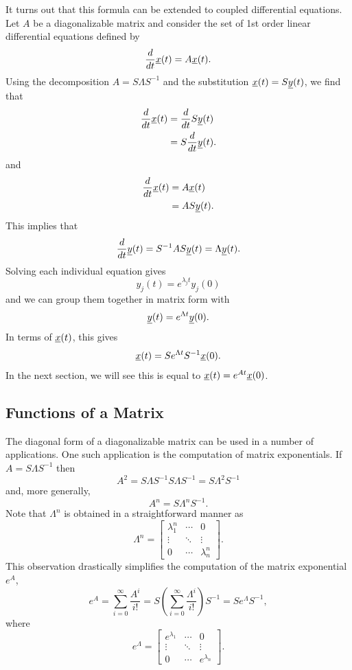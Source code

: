 It turns out that this formula can be extended to coupled differential equations.
Let $A$ be a diagonalizable matrix and consider the set of 1st order linear differential equations defined by
\[ \frac{d}{dt} \underline{x}(t) = A \underline{x}(t). \]
Using the decomposition $A = S \Lambda S^{-1}$ and the substitution $\underline{x}(t) = S \underline{y}(t)$, we find that
\begin{align*}
\frac{d}{dt} \underline{x}(t)
& = \frac{d}{dt} S \underline{y}(t) \\
& = S \frac{d}{dt} \underline{y}(t).
\end{align*}
and
\begin{align*}
\frac{d}{dt} \underline{x}(t)
& = A \underline{x}(t) \\
& = A S \underline{y}(t).
\end{align*}
This implies that
\[ \frac{d}{dt} \underline{y}(t) = S^{-1} A S \underline{y}(t) = \Lambda \underline{y}(t). \]
Solving each individual equation gives
\[ y_j (t) = e^{\lambda_j t} y_j (0) \]
and we can group them together in matrix form with
\[ \underline{y}(t) = e^{\Lambda t} \underline{y}(0). \]
In terms of $\underline{x}(t)$, this gives
\[ \underline{x}(t) = S e^{\Lambda t} S^{-1} \underline{x}(0). \]
In the next section, we will see this is equal to $ \underline{x}(t) = e^{A t} \underline{x}(0)$.

\subsection{Functions of a Matrix}

The diagonal form of a diagonalizable matrix can be used in a number of applications.
One such application is the computation of matrix exponentials.
If $A = S \Lambda S^{-1}$ then
\begin{equation*}
A^2 = S \Lambda S^{-1} S \Lambda S^{-1}
= S \Lambda^2 S^{-1}
\end{equation*}
and, more generally,
\begin{equation*}
A^n = S \Lambda^n S^{-1}.
\end{equation*}
Note that $\Lambda^n$ is obtained in a straightforward manner as
\begin{equation*}
\Lambda^n = \begin{bmatrix}
\lambda_1^n & \cdots & 0 \\
\vdots & \ddots & \vdots \\
0 & \cdots & \lambda_n^n
\end{bmatrix} .
\end{equation*}
This observation drastically simplifies the computation of the matrix exponential $e^A$,
\begin{equation*}
e^A = \sum_{i=0}^{\infty} \frac{A^i}{i!}
= S \left( \sum_{i=0}^{\infty} \frac{\Lambda^i}{i!} \right) S^{-1}
= S e^{\Lambda} S^{-1},
\end{equation*}
where
\begin{equation*}
e^{\Lambda} = \begin{bmatrix}
e^{\lambda_1} & \cdots & 0 \\
\vdots & \ddots & \vdots \\
0 & \cdots & e^{\lambda_n}
\end{bmatrix} .
\end{equation*}

